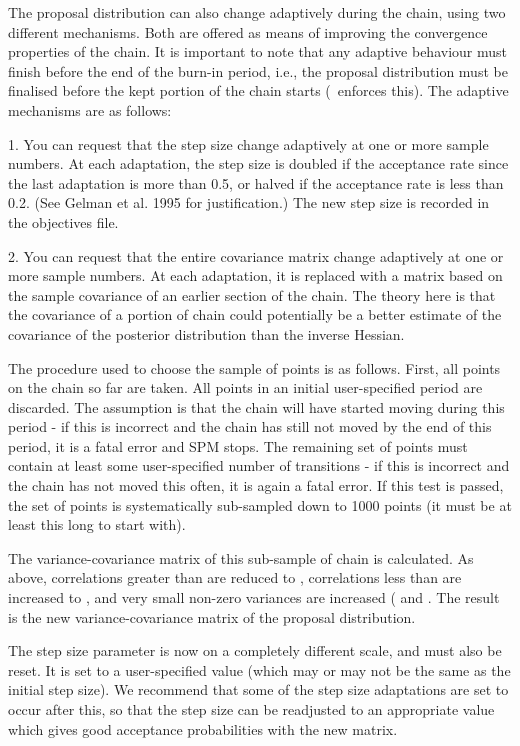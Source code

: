 The proposal distribution can also change adaptively during the chain, using two different mechanisms. Both are offered as means of improving the convergence properties of the chain. It is important to note that any adaptive behaviour must finish before the end of the burn-in period, i.e., the proposal distribution must be finalised before the kept portion of the chain starts (\SPM\ enforces this). The adaptive mechanisms are as follows: 

1.	You can request that the step size change adaptively at one or more sample numbers. At each adaptation, the step size is doubled if the acceptance rate since the last adaptation is more than 0.5, or halved if the acceptance rate is less than 0.2. (See Gelman et al. 1995 for justification.) The new step size is recorded in the objectives file. 

2.	You can request that the entire covariance matrix change adaptively at one or more sample numbers. At each adaptation, it is replaced with a matrix based on the sample covariance of an earlier section of the chain. The theory here is that the covariance of a portion of chain could potentially be a better estimate of the covariance of the posterior distribution than the inverse Hessian.

	The procedure used to choose the sample of points is as follows. First, all points on the chain so far are taken. All points in an initial user-specified period are discarded. The assumption is that the chain will have started moving during this period - if this is incorrect and the chain has still not moved by the end of this period, it is a fatal error and SPM stops. The remaining set of points must contain at least some user-specified number of transitions - if this is incorrect and the chain has not moved this often, it is again a fatal error. If this test is passed, the set of points is systematically sub-sampled down to 1000 points (it must be at least this long to start with).

The variance-covariance matrix of this sub-sample of chain is calculated. As above, correlations greater than  are reduced to , correlations less than  are increased to  , and very small non-zero variances are increased ( and . The result is the new variance-covariance matrix of the proposal distribution.

The step size parameter is now on a completely different scale, and must also be reset. It is set to a user-specified value (which may or may not be the same as the initial step size). We recommend that some of the step size adaptations are set to occur after this, so that the step size can be readjusted to an appropriate value which gives good acceptance probabilities with the new matrix. 


